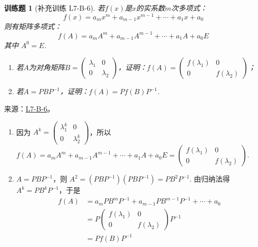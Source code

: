 \documentclass[12pt,fontset=fandol]{ctexart}
\newtheorem{exercise}{训练题}[section]
\begin{document}
\begin{exercise}[补充训练 L7-B-6]\label{prob:L7-B-6}
若$f(x)$是$x$的实系数$m$次多项式：
        \[f(x)=a_mx^m+a_{m-1}x^{m-1}+\cdots+a_1x+a_0\]
        则有矩阵多项式：
        \[f(A)=a_mA^m+a_{m-1}A^{m-1}+\cdots+a_1A+a_0E\]
        其中 $A^0=E$.
        \begin{enumerate}
            \item 若$A$为对角矩阵$B=\begin{pmatrix}
                          \lambda_1 & 0 \\ 0 & \lambda_2
                      \end{pmatrix}$，证明：$f(A)=\begin{pmatrix}
                          f(\lambda_1) & 0 \\ 0 & f(\lambda_2)
                      \end{pmatrix}$；

            \item 若$A=PBP^{-1}$，证明：$f(A)=Pf(B)P^{-1}$.
        \end{enumerate}
\end{exercise}
\noindent 来源：\href{https://github.com/yhwu-is/Linear-Algebra-Left-Undone/blob/new/%E8%AE%B2%E4%B9%89/%E4%B8%93%E9%A2%98/7%20%E7%BA%BF%E6%80%A7%E6%98%A0%E5%B0%84%E7%9F%A9%E9%98%B5%E8%A1%A8%E7%A4%BA%E4%B8%8E%E7%9F%A9%E9%98%B5%E8%BF%90%E7%AE%97%E5%9F%BA%E7%A1%80.tex}{L7-B-6}。
\begin{solve}
\begin{enumerate}
                \item 因为 $A^k=\begin{pmatrix}\lambda_1^k & 0 \\ 0 & \lambda_2^k\end{pmatrix}$，所以 $f(A)=a_mA^m+a_{m-1}A^{m-1}+\cdots+a_1A+a_0E = \begin{pmatrix}f(\lambda_1) & 0 \\ 0 & f(\lambda_2)\end{pmatrix}$.
                \item $A=PBP^{-1}$，则 $A^2=(PBP^{-1})(PBP^{-1})=PB^2P^{-1}$. 由归纳法得 $A^k=PB^kP^{-1}$，于是
                      \begin{align*}
                          f(A) & = a_mPB^mP^{-1}+a_{m-1}PB^{m-1}P^{-1}+\cdots+a_0                         \\
                               & =P\begin{pmatrix}f(\lambda_1) & 0 \\ 0 & f(\lambda_2)\end{pmatrix}P^{-1} \\
                               & =Pf(B)P^{-1}
                      \end{align*}
            \end{enumerate}
\end{solve}
\end{document}
